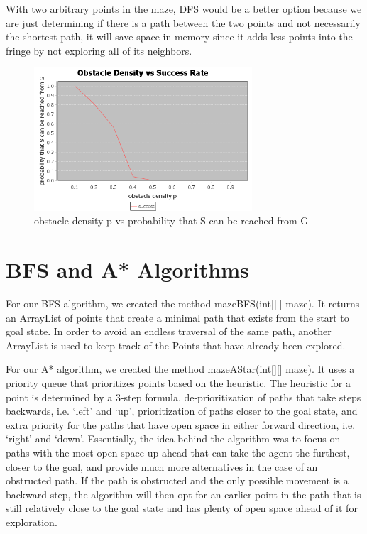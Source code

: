 \documentclass{article}
\begin{document}
	With two arbitrary points in the maze, DFS would be a better option because we are just determining if there is a path between the two points and not necessarily the shortest path, it will save space in memory since it adds less points into the fringe by not exploring all of its neighbors.
	\begin{figure}[hpt]

\centering
\includegraphics[width=3.2in]{DFSanalysis}

\caption{obstacle density p vs probability that S can be reached from G}
\label{fig:figure2}

\end{figure}

\section{BFS and A* Algorithms}
  For our BFS algorithm, we created the method mazeBFS(int[][] maze). It returns an ArrayList of points that create a minimal path that exists from the start to goal state. In order to avoid an endless traversal of the same path, another ArrayList is used to keep track of the Points that have already been explored.
   
For our A* algorithm, we created the method mazeAStar(int[][] maze). It uses a priority queue that prioritizes points based on the heuristic. The heuristic for a point is determined by a 3-step formula, de-prioritization of paths that take steps backwards, i.e. ‘left’ and ‘up’, prioritization of paths closer to the goal state, and extra priority for the paths that have open space in either forward direction, i.e. ‘right’ and ‘down’. Essentially, the idea behind the algorithm was to focus on paths with the most open space up ahead that can take the agent the furthest, closer to the goal, and provide much more alternatives in the case of an obstructed path. If the path is obstructed and the only possible movement is a backward step, the algorithm will then opt for an earlier point in the path that is still relatively close to the goal state and has plenty of open space ahead of it for exploration.
   
\end{document}
